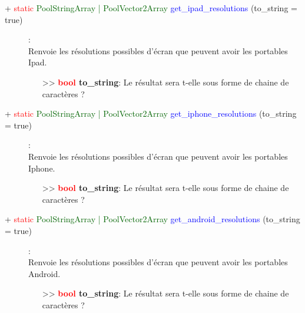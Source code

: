 \documentclass[a4paper, 11pt]{article}
\begin{document}
	\begin{description}
		\item [+ \textcolor{red}{static} \textcolor{darkgreen}{PoolStringArray | PoolVector2Array} 
		\textcolor{blue}{get\_ipad\_resolutions} (to\_string = true)]: \\Renvoie les résolutions possibles
		d'écran que peuvent avoir les portables Ipad.
		\begin{itemize}
			\item[>> \textbf{\textcolor{red}{bool} to\_string}:] Le résultat sera t-elle sous forme de 
			chaine de caractères ?\\
		\end{itemize}
	\end{description}
	\begin{description}
		\item [+ \textcolor{red}{static} \textcolor{darkgreen}{PoolStringArray | PoolVector2Array} 
		\textcolor{blue}{get\_iphone\_resolutions} (to\_string = true)]: \\Renvoie les résolutions possibles
		d'écran que peuvent avoir les portables Iphone.
		\begin{itemize}
			\item[>> \textbf{\textcolor{red}{bool} to\_string}:] Le résultat sera t-elle sous forme de 
			chaine de caractères ?\\
		\end{itemize}
	\end{description}
	\begin{description}
		\item [+ \textcolor{red}{static} \textcolor{darkgreen}{PoolStringArray | PoolVector2Array} 
		\textcolor{blue}{get\_android\_resolutions} (to\_string = true)]: \\Renvoie les résolutions 
		possibles d'écran que peuvent avoir les portables Android.
		\begin{itemize}
			\item[>> \textbf{\textcolor{red}{bool} to\_string}:] Le résultat sera t-elle sous forme de 
			chaine de caractères ?\\
		\end{itemize}
	\end{description}
\end{document}
